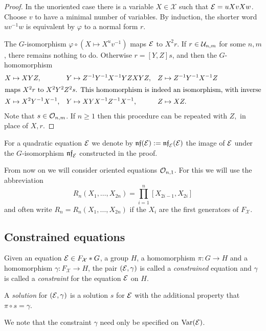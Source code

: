 \documentclass[a4paper,11pt]{amsart}
\begin{document}
\begin{proof}
  In the unoriented case there is a variable $X\in\mathcal{X}$ such that
  $\mathcal{E} = uXvXw$. Choose $v$ to have a minimal number of variables.
  By induction, the shorter word
  $uv^{-1}w$ is equivalent by $\varphi$ to a normal form $r$.
 
  The $G$-isomorphism $\varphi \circ (X\mapsto X^uv^{-1})$ maps $\mathcal{E}$ to
  $X^2r$. If $r\in \mathcal{U}_{n,m}$ for some $n,m$,
  there remains nothing to do.  Otherwise $r=[Y,Z]s$, and then the
  $G$-homomorphism
  \begin{align*}
    X&\mapsto XYZ, & Y&\mapsto Z^{-1}Y^{-1}X^{-1}YZXYZ, & Z&\mapsto Z^{-1}Y^{-1}X^{-1}Z \\
  \intertext{maps $X^2r$ to $X^2Y^2Z^2s$. This homomorphism is indeed an
  isomorphism, with inverse}
    X&\mapsto X^2Y^{-1}X^{-1}, & Y&\mapsto XYX^{-1}Z^{-1}X^{-1}, & Z&\mapsto XZ.
  \end{align*}
  Note that $s \in \mathcal{O}_{n,m}$. If $n\geq 1$ then this procedure can be repeated with
  $Z,$ in place of $X,r$.
\end{proof}
For a quadratic equation $\mathcal{E}$ we denote by $\mathfrak{nf}(\mathcal{E}) := \mathfrak{nf}_{\mathcal{E}}(\mathcal{E})$
the image of $\mathcal{E}$ under the $G$-isomorphism $\mathfrak{nf}_{\mathcal{E}}$ constructed in
the proof.

From now on we will consider oriented equations $\mathcal{O}_{n,1}$. For this
we will use the abbreviation
\[R_n(X_1,\dotsc,X_{2n})=\prod_{i=1}^n [X_{2i-1},X_{2i}]\]
and often write $R_n=R_n(X_1,\dotsc,X_{2n})$ if the $X_i$ are the
first generators of $F_{\mathcal{X}}$.

\subsection{Constrained equations}
\begin{defi}
  Given an equation $\mathcal{E} \in F_{\mathcal{X}}*G$, a group $H$, a
  homomorphism $\pi\colon G \to H$ and a homomorphism
  $\gamma\colon F_{\mathcal{X}} \to H$, the pair $(\mathcal{E},\gamma)$ is
  called a \emph{constrained} equation and $\gamma$ is called a
  \emph{constraint} for the equation $\mathcal{E}$ on $H$.
 
  A \emph{solution} for $(\mathcal{E},\gamma)$ is a solution $s$ for
  $\mathcal{E}$ with the additional property that $\pi\circ s=\gamma$.
\end{defi}
We note that the constraint $\gamma$ need only be specified on $\textup{Var}(\mathcal{E})$.

\end{document}
